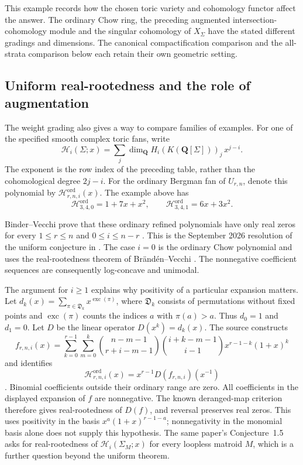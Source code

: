 This example records how the chosen toric variety and cohomology
functor affect the answer. The ordinary Chow ring, the preceding
augmented intersection-cohomology module and the singular
cohomology of $X_\Sigma$ have the stated different gradings and
dimensions. The canonical compactification comparison and the
all-strata comparison below each retain their own geometric setting.

\subsection{Uniform real-rootedness and the role of augmentation}
\label{sec:appG-uniform-real-rootedness}

The weight grading also gives a way to compare families of examples.
For one of the specified smooth complex toric fans, write
\[
 \mathcal H_i(\Sigma;x)=
    \sum_j\dim_{\mathbf Q}H_i(K(\mathbf Q[\Sigma]))_j\,x^{j-i}.
\]
The exponent is the row index of the preceding table, rather than
the cohomological degree $2j-i$. For the ordinary Bergman fan of
$U_{r,n}$, denote this polynomial by
$\mathcal H^{\mathrm{ord}}_{r,n,i}(x)$. The example above has
\[
 \mathcal H^{\mathrm{ord}}_{3,4,0}=1+7x+x^2,
 \qquad \mathcal H^{\mathrm{ord}}_{3,4,1}=6x+3x^2.
\]

Binder--Vecchi prove that these ordinary refined polynomials have
only real zeros for every $1\le r\le n$ and $0\le i\le n-r$
\cite[Theorem~1.4]{BinderVecchi26AugmentedCohomology}.
This is the September 2026 resolution of the uniform conjecture
in \cite[Conjecture~5.8]{Binder26UniformCohomology}.
The case $i=0$ is the ordinary Chow polynomial and uses the
real-rootedness theorem of Br\"and\'en--Vecchi
\cite[Theorem~1.1]{BrandenVecchi26UniformChow}.
The nonnegative coefficient sequences are consequently log-concave
and unimodal.

The argument for $i\ge1$ explains why positivity of a particular
expansion matters. Let $d_k(x)=\sum_{\pi\in\mathfrak D_k}
x^{\operatorname{exc}(\pi)}$, where $\mathfrak D_k$ consists of
permutations without fixed points and $\operatorname{exc}(\pi)$
counts the indices $a$ with $\pi(a)>a$. Thus $d_0=1$ and $d_1=0$.
Let $D$ be the linear operator
$D(x^k)=d_k(x)$. The source constructs
\[
 f_{r,n,i}(x)=\sum_{k=0}^{r-1}\sum_{m=0}^k
   \binom{n-m-1}{r+i-m-1}\binom{i+k-m-1}{i-1}
      x^{r-1-k}(1+x)^k
\]
and identifies
\[
 \mathcal H^{\mathrm{ord}}_{r,n,i}(x)
       =x^{r-1}D(f_{r,n,i})(x^{-1})
\]
\cite[\S7.2]{BinderVecchi26AugmentedCohomology}.
Binomial coefficients outside their ordinary range are zero.
All coefficients in the displayed expansion of $f$ are
nonnegative. The known deranged-map criterion
\cite[Corollary~3.7]{BrandenSolus21Symmetric} therefore gives
real-rootedness of $D(f)$, and reversal preserves real zeros.
This uses positivity in the basis $x^a(1+x)^{r-1-a}$;
nonnegativity in the monomial basis alone does not supply this hypothesis.
The same paper's Conjecture~1.5 asks for real-rootedness of
$\mathcal H_i(\Sigma_M;x)$ for every loopless matroid $M$,
which is a further question beyond the uniform theorem.

